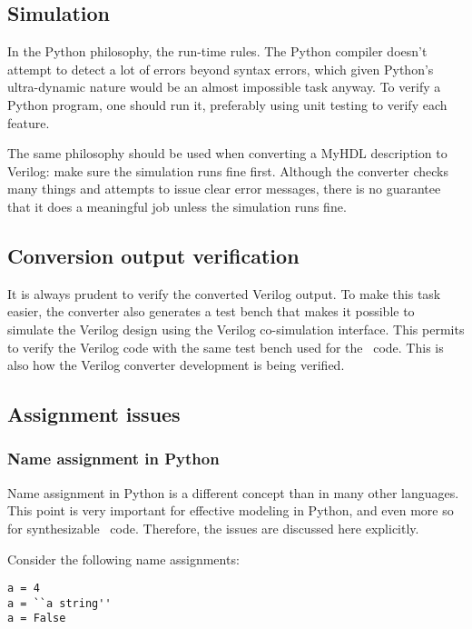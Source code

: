 \subsection{Simulation\label{conv-meth-sim}}

In the Python philosophy, the run-time rules. The Python compiler
doesn't attempt to detect a lot of errors beyond syntax errors, which
given Python's ultra-dynamic nature would be an almost impossible task
anyway. To verify a Python program, one should run it, preferably
using unit testing to verify each feature.

The same philosophy should be used when converting a MyHDL description
to Verilog: make sure the simulation runs fine first. Although the
converter checks many things and attempts to issue clear error
messages, there is no guarantee that it does a meaningful job unless
the simulation runs fine.

\subsection{Conversion output verification\label{conv-meth-conv}}
It is always prudent to verify the converted Verilog output.
To make this task easier, the converter also generates a
test bench that makes it possible to simulate the Verilog
design using the Verilog co-simulation interface. This 
permits to verify the Verilog code with the same test
bench used for the \myhdl\ code. This is also how
the Verilog converter development is being verified.

\subsection{Assignment issues\label{conv-meth-assign}}

\subsubsection{Name assignment in Python\label{conv-meth-assign-python}}

Name assignment in Python is a different concept than in
many other languages. This point is very important for
effective modeling in Python, and even more so
for synthesizable \myhdl\ code. Therefore, the issues are
discussed here explicitly.

Consider the following name assignments:

\begin{verbatim}
a = 4
a = ``a string''
a = False
\end{verbatim}

